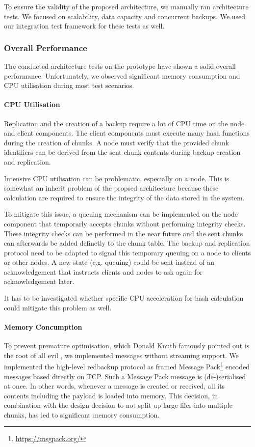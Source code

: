 To ensure the validity of the proposed architecture, we manually ran architecture tests. We focused on scalability, data capacity and concurrent backups. We used our integration test framework for these tests as well.

\subsubsection{Overall Performance}\label{sec:overall-performance}

The conducted architecture tests on the prototype have shown a solid overall performance. Unfortunately, we observed significant memory consumption and CPU utilisation during most test scenarios.

\paragraph{CPU Utilisation}
Replication and the creation of a backup require a lot of CPU time on the \gls{node} and \gls{client} components. The \gls{client} components must execute many hash functions during the creation of chunks. A \gls{node} must verify that the provided chunk identifiers can be derived from the sent chunk contents during backup creation and replication.

Intensive CPU utilisation can be problematic, especially on a \gls{node}. This is somewhat an inherit problem of the propsed architecture because these calculation are required to ensure the integrity of the data stored in the system.

To mitigate this issue, a queuing mechanism can be implemented on the \gls{node} component that temporarly accepts chunks without performing integrity checks. These integrity checks can be performed in the near future and the sent chunks can afterwards be added definetly to the chunk table. The backup and replication protocol need to be adapted to signal this temporary queuing on a \gls{node} to \glspl{client} or other \glspl{node}. A new state (e.g. queuing) could be sent instead of an acknowledgement that instructs \glspl{client} and \glspl{node} to ask again for acknowledgement later.

It has to be investigated whether specific CPU acceleration for hash calculation could mitigate this problem as well.

\paragraph{Memory Concumption}
To prevent premature optimisation, which Donald Knuth famously pointed out is the root of all evil \cite{knuth-optimise}, we implemented \glspl{message} without streaming support. We implemented the high-level redbackup protocol as framed Message Pack\footnote{\url{https://msgpack.org/}} encoded \glspl{message} based directly on TCP. Such a Message Pack \gls{message} is (de-)serialised at once. In other words, whenever a \gls{message} is created or received, all its contents including the payload is loaded into memory. This decision, in combination with the design decision to not split up large files into multiple chunks, has led to significant memory consumption.


